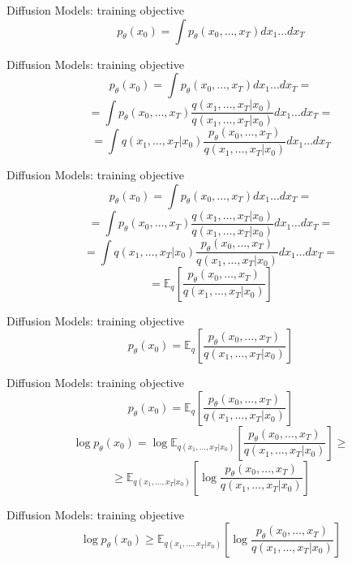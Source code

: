 \documentclass{beamer}
\begin{document}
\begin{frame}[t]{Diffusion Models: training objective \cite{sohldickstein2015deep}}
    $$ p_\theta(x_0) = \int p_\theta(x_0, \dots, x_T) dx_1 \dots dx_T $$
\end{frame}

\begin{frame}[t]{Diffusion Models: training objective \cite{sohldickstein2015deep}}
    $$ p_\theta(x_0) = \int p_\theta(x_0, \dots, x_T) dx_1 \dots dx_T = $$
    $$ = \int p_\theta(x_0, \dots, x_T) \frac{q(x_1, \dots, x_T|x_0)}{q(x_1, \dots, x_T|x_0)} dx_1 \dots dx_T = $$
    $$ = \int q(x_1, \dots, x_T|x_0) \frac{p_\theta(x_0, \dots, x_T)}{q(x_1, \dots, x_T|x_0)} dx_1 \dots dx_T $$
\end{frame}

\begin{frame}[t]{Diffusion Models: training objective \cite{sohldickstein2015deep}}
    $$ p_\theta(x_0) = \int p_\theta(x_0, \dots, x_T) dx_1 \dots dx_T = $$
    $$ = \int p_\theta(x_0, \dots, x_T) \frac{q(x_1, \dots, x_T|x_0)}{q(x_1, \dots, x_T|x_0)} dx_1 \dots dx_T = $$
    $$ = \int q(x_1, \dots, x_T|x_0) \frac{p_\theta(x_0, \dots, x_T)}{q(x_1, \dots, x_T|x_0)} dx_1 \dots dx_T = $$
    $$ = \mathbb{E}_q \left[ \frac{p_\theta(x_0, \dots, x_T)}{q(x_1, \dots, x_T|x_0)} \right] $$
\end{frame}

\begin{frame}[t]{Diffusion Models: training objective \cite{sohldickstein2015deep}}
    $$ p_\theta(x_0) = \mathbb{E}_q \left[ \frac{p_\theta(x_0, \dots, x_T)}{q(x_1, \dots, x_T|x_0)} \right] $$
\end{frame}

\begin{frame}[t]{Diffusion Models: training objective \cite{sohldickstein2015deep}}
    $$ p_\theta(x_0) = \mathbb{E}_q \left[ \frac{p_\theta(x_0, \dots, x_T)}{q(x_1, \dots, x_T|x_0)} \right] $$
    $$ \log p_\theta(x_0) = \log \mathbb{E}_{q(x_1, \dots, x_T|x_0)} \left[ \frac{p_\theta(x_0, \dots, x_T)}{q(x_1, \dots, x_T|x_0)} \right] \geq $$
    $$ \geq \mathbb{E}_{q(x_1, \dots, x_T|x_0)} \left[ \log \frac{p_\theta(x_0, \dots, x_T)}{q(x_1, \dots, x_T|x_0)} \right] $$
\end{frame}

\begin{frame}[t]{Diffusion Models: training objective \cite{sohldickstein2015deep}}
    $$ \log p_\theta(x_0) \geq \mathbb{E}_{q(x_1, \dots, x_T|x_0)} \left[ \log \frac{p_\theta(x_0, \dots, x_T)}{q(x_1, \dots, x_T|x_0)} \right] $$
\end{frame}
\end{document}
